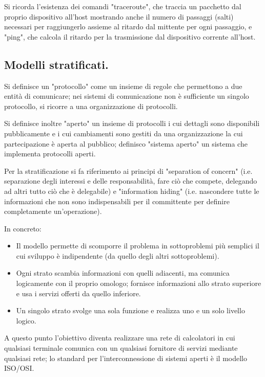 \documentclass[11pt, italian, openany]{book}
\begin{document}
\begin{sloppypar}
Si ricorda l'esistenza dei comandi "traceroute", che traccia un pacchetto dal proprio dispositivo all'host mostrando anche il numero di passaggi
(salti) necessari per raggiungerlo assieme al ritardo dal mittente per ogni passaggio, e "ping", che calcola il ritardo per la trasmissione dal
dispositivo corrente all'host.

\subsection{Modelli stratificati.}
Si definisce un "protocollo" come un insieme di regole che permettono a due entit\`a di comunicare; nei sistemi di comunicazione non \`e
sufficiente un singolo protocollo, si ricorre a una organizzazione di protocolli.

Si definisce inoltre "aperto" un insieme di protocolli i cui dettagli sono disponibili pubblicamente e i cui cambiamenti sono gestiti da una
organizzazione la cui partecipazione \`e aperta al pubblico; definisco "sistema aperto" un sistema che implementa protocolli aperti.

Per la stratificazione si fa riferimento ai principi di "separation of concern" (i.e. separazione degli interessi e delle responsabilit\`a, fare
ci\`o che compete, delegando ad altri tutto ci\`o che \`e delegabile) e "information hiding" (i.e. nascondere tutte le informazioni che non sono
indispensabili per il committente per definire completamente un'operazione).

In concreto:
\begin{itemize}[topsep=0pt]
	\itemsep-0.3em
	\item Il modello permette di scomporre il problema in sottoproblemi pi\`u semplici il cui sviluppo \`e indipendente (da quello degli altri
	sottoproblemi).
	\item Ogni strato scambia informazioni con quelli adiacenti, ma comunica logicamente con il proprio omologo; fornisce informazioni allo strato
	superiore e usa i servizi offerti da quello inferiore.
	\item Un singolo strato svolge una sola funzione e realizza uno e un solo livello logico.
\end{itemize}

A questo punto l'obiettivo diventa realizzare una rete di calcolatori in cui qualsiasi terminale comunica con un qualsiasi fornitore di servizi
mediante qualsiasi rete; lo standard per l'interconnessione di sistemi aperti \`e il modello ISO/OSI.


\end{sloppypar}
\end{document}
